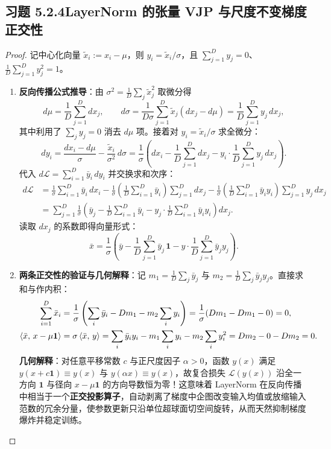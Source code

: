 \subsection*{习题 5.2.4\quad LayerNorm 的张量 VJP 与尺度不变梯度正交性}
\begin{proof}
记中心化向量 $\tilde{x}_i := x_i - \mu$，则 $y_i = \tilde{x}_i / \sigma$，且 $\sum_{j=1}^D y_j = 0$、$\frac{1}{D}\sum_{j=1}^D y_j^2 = 1$。
\begin{enumerate}[label=(\alph*), leftmargin=1.8em]
  \item \textbf{反向传播公式推导}：由 $\sigma^2 = \frac{1}{D}\sum_j \tilde{x}_j^2$ 取微分得
  \[
    d\mu = \frac{1}{D}\sum_{j=1}^D dx_j, \qquad
    d\sigma = \frac{1}{D\sigma}\sum_{j=1}^D \tilde{x}_j (dx_j - d\mu) = \frac{1}{D}\sum_{j=1}^D y_j\, dx_j,
  \]
  其中利用了 $\sum_j y_j = 0$ 消去 $d\mu$ 项。接着对 $y_i = \tilde{x}_i / \sigma$ 求全微分：
  \[
    dy_i = \frac{dx_i - d\mu}{\sigma} - \frac{\tilde{x}_i}{\sigma^2}\, d\sigma
         = \frac{1}{\sigma}\left(dx_i - \frac{1}{D}\sum_{j=1}^D dx_j - y_i \cdot \frac{1}{D}\sum_{j=1}^D y_j\, dx_j\right).
  \]
  代入 $d\mathcal{L} = \sum_{i=1}^D \bar{y}_i\, dy_i$ 并交换求和次序：
  \begin{align*}
    d\mathcal{L}
    &= \frac{1}{\sigma}\sum_{i=1}^D \bar{y}_i\, dx_i
     - \frac{1}{\sigma}\left(\frac{1}{D}\sum_{i=1}^D \bar{y}_i\right)\sum_{j=1}^D dx_j
     - \frac{1}{\sigma}\left(\frac{1}{D}\sum_{i=1}^D \bar{y}_i y_i\right)\sum_{j=1}^D y_j\, dx_j \\
    &= \sum_{j=1}^D \frac{1}{\sigma}\left(\bar{y}_j - \frac{1}{D}\sum_{i=1}^D \bar{y}_i - y_j \cdot \frac{1}{D}\sum_{i=1}^D \bar{y}_i y_i\right) dx_j.
  \end{align*}
  读取 $dx_j$ 的系数即得向量形式：
  \[
    \bar{x} = \frac{1}{\sigma}\left(\bar{y} - \frac{1}{D}\sum_{j=1}^D \bar{y}_j\,\mathbf{1} - y \cdot \frac{1}{D}\sum_{j=1}^D \bar{y}_j y_j\right).
  \]

  \item \textbf{两条正交性的验证与几何解释}：记 $m_1 = \frac{1}{D}\sum_j \bar{y}_j$ 与 $m_2 = \frac{1}{D}\sum_j \bar{y}_j y_j$。直接求和与作内积：
  \begin{align*}
    \sum_{i=1}^D \bar{x}_i
    &= \frac{1}{\sigma}\left(\sum_i \bar{y}_i - D m_1 - m_2 \sum_i y_i\right)
     = \frac{1}{\sigma}(D m_1 - D m_1 - 0) = 0, \\
    \left\langle \bar{x},\, x - \mu\mathbf{1} \right\rangle
    &= \sigma \left\langle \bar{x},\, y \right\rangle
     = \sum_i \bar{y}_i y_i - m_1 \sum_i y_i - m_2 \sum_i y_i^2
     = D m_2 - 0 - D m_2 = 0.
  \end{align*}
  \textbf{几何解释}：对任意平移常数 $c$ 与正尺度因子 $\alpha > 0$，函数 $y(x)$ 满足 $y(x + c\mathbf{1}) \equiv y(x)$ 与 $y(\alpha x) \equiv y(x)$，故复合损失 $\mathcal{L}(y(x))$ 沿全一方向 $\mathbf{1}$ 与径向 $x - \mu\mathbf{1}$ 的方向导数恒为零！这意味着 LayerNorm 在反向传播中相当于一个\textbf{正交投影算子}，自动剥离了梯度中企图改变输入均值或放缩输入范数的冗余分量，使参数更新只沿单位超球面切空间旋转，从而天然抑制梯度爆炸并稳定训练。
\end{enumerate}
\end{proof}

